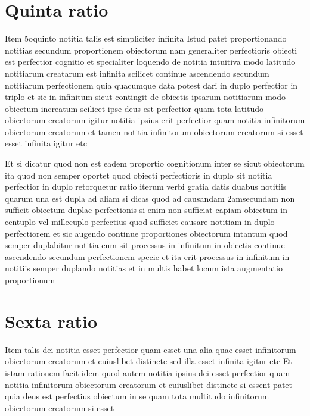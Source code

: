 \documentclass[twoside, openright]{report}
\begin{document}
         \section*{Quinta ratio} 
        \pstart
        Item 5oquinto notitia talis est simpliciter infinita Istud patet proportionando notitias secundum proportionem obiectorum nam generaliter perfectioris obiecti est perfectior cognitio et specialiter loquendo de notitia intuitiva modo latitudo notitiarum creatarum est infinita scilicet continue ascendendo secundum notitiarum perfectionem quia quacumque data potest dari in duplo perfectior in triplo et sic in infinitum sicut contingit de obiectis ipsarum notitiarum modo obiectum increatum scilicet ipse deus est perfectior quam tota latitudo obiectorum creatorum igitur notitia ipsius erit perfectior quam notitia infinitorum obiectorum creatorum et tamen notitia infinitorum obiectorum creatorum si esset esset infinita igitur etc
        \pend
     
        \pstart
        Et si dicatur quod non est eadem proportio cognitionum inter se sicut obiectorum ita quod non semper oportet quod obiecti perfectioris in duplo  sit notitia perfectior in duplo  retorquetur ratio iterum verbi gratia datis duabus notitiis quarum una est dupla ad aliam  si dicas quod ad causandam 2amsecundam non sufficit obiectum duplae perfectionis si enim non sufficiat capiam obiectum in centuplo vel millecuplo perfectius quod sufficiet causare notitiam in duplo perfectiorem et sic augendo continue proportiones obiectorum intantum quod semper duplabitur notitia cum sit processus in infinitum in obiectis continue ascendendo secundum perfectionem specie  et ita erit processus in infinitum in notitiis semper duplando notitias et in multis habet locum ista augmentatio proportionum
        \pend
      
        \bigskip
         \section*{Sexta ratio} 
        \pstart
        Item talis dei notitia esset perfectior quam esset una alia quae esset infinitorum obiectorum creatorum et cuiuslibet distincte sed illa esset infinita igitur etc Et istam rationem facit idem quod autem notitia ipsius dei esset perfectior quam notitia infinitorum obiectorum creatorum et cuiuslibet distincte si essent patet quia deus est perfectius obiectum in se quam tota multitudo infinitorum obiectorum creatorum si esset
        \pend
      
\end{document}
